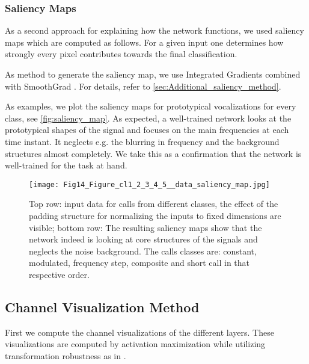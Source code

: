 \documentclass[preprint,NumberedRefs]{JASA}
\begin{document}
\FloatBarrier

\subsubsection{Saliency Maps}
\label{sec:Saliency_Maps}

As a second approach for explaining how the network functions, we used saliency maps which are computed as follows. For a given input one determines how strongly every pixel contributes towards the final classification.

As method to generate the saliency map, we use Integrated Gradients \cite{pmlr-v70-sundararajan17a} combined with SmoothGrad \cite{SmoothGrad}. For details, refer to \autoref{sec:Additional_saliency_method}.

As examples, we plot the saliency maps for prototypical vocalizations for every class, see \autoref{fig:saliency_map}. As expected, a well-trained network looks at the prototypical shapes of the signal and focuses on the main frequencies at each time instant. It neglects e.g. the blurring in frequency and the background structures almost completely. We take this as a confirmation that the network is well-trained for the task at hand.

\begin{figure}[ht]
    \texttt{[image: Fig14\_Figure\_cl1\_2\_3\_4\_5\_\_data\_saliency\_map.jpg]}
    \caption{\label{fig:saliency_map}{Top row: input data for calls from different classes, the effect of the padding structure for normalizing the inputs to fixed dimensions are visible; bottom row: The resulting saliency maps show that the network indeed is looking at core structures of the signals and neglects the noise background. The calls classes are: constant, modulated, frequency step, composite and short call in that respective order.}}
\end{figure}

\FloatBarrier

\subsection{Channel Visualization Method}
\label{sec:Channel_visualization_method}

First we compute the channel visualizations of the different layers. These visualizations are computed by activation maximization \cite{ActiviationMaximization} while utilizing transformation robustness as in \cite{olah2017feature}.
\end{document}
